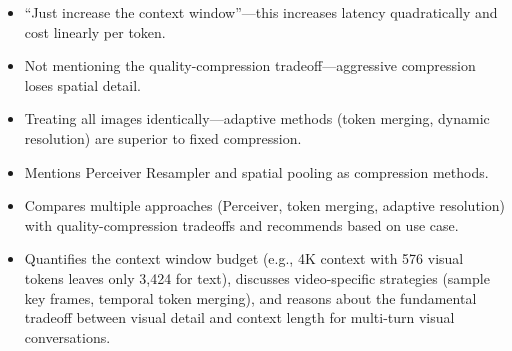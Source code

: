 \begin{interviewq}
\redflags
\begin{itemize}
    \item ``Just increase the context window''---this increases latency quadratically and cost linearly per token.
    \item Not mentioning the quality-compression tradeoff---aggressive compression loses spatial detail.
    \item Treating all images identically---adaptive methods (token merging, dynamic resolution) are superior to fixed compression.
\end{itemize}


\goodgreat
\begin{itemize}
    \item {} Mentions Perceiver Resampler and spatial pooling as compression methods.
    \item {} Compares multiple approaches (Perceiver, token merging, adaptive resolution) with quality-compression tradeoffs and recommends based on use case.
    \item {} Quantifies the context window budget (e.g., 4K context with 576 visual tokens leaves only 3,424 for text), discusses video-specific strategies (sample key frames, temporal token merging), and reasons about the fundamental tradeoff between visual detail and context length for multi-turn visual conversations.
\end{itemize}

\end{interviewq}


